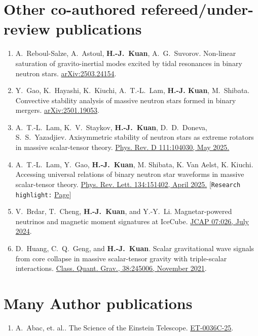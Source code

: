 \documentclass[10pt,floatfix,a4paper]{article}
\begin{document}
\section*{Other co-authored refereed/under-review publications}
\begin{enumerate}
	\item A.~Reboul-Salze, A.~Astoul, \textbf{H.-J.~Kuan}, A.~G.~Suvorov. Non-linear saturation of gravito-inertial modes excited by tidal resonances in binary neutron stars. \href{https://arxiv.org/abs/2503.24154}{arXiv:2503.24154}.
	\item Y.~Gao, K.~Hayashi, K.~Kiuchi, A.~T.-L.~Lam, \textbf{H.-J. Kuan}, M.~Shibata. Convective stability analysis of massive neutron stars formed in binary mergers. \href{https://arxiv.org/abs/2501.19053}{arXiv:2501.19053}.
	\item A.~T.-L.~Lam, K.~V.~Staykov, \textbf{H.-J.~Kuan}, D.~D.~Doneva, S.~S.~Yazadjiev. Axisymmetric stability of neutron stars as extreme rotators in massive scalar-tensor theory. \href{https://journals.aps.org/prd/abstract/10.1103/PhysRevD.111.104030}{Phys. Rev. D 111:104030, May 2025.}
	\item A.~T.-L.~Lam, Y.~Gao, \textbf{H.-J.~Kuan}, M. Shibata, K. Van Aelst, K. Kiuchi. Accessing universal relations of binary neutron star waveforms in massive scalar-tensor theory. \href{https://journals.aps.org/prl/abstract/10.1103/PhysRevLett.134.151402}{Phys. Rev. Lett. 134:151402, April 2025.} [\texttt{Research highlight:} \href{https://www.aei.mpg.de/1246017/modelling-120-binary-neutron-star-mergers?c=26149}{Page}]
	\item V.~Brdar, T.~Cheng, \textbf{H.-J.~Kuan}, and Y.-Y.~Li. Magnetar-powered neutrinos and magnetic moment signatures at IceCube. \href{https://iopscience.iop.org/article/10.1088/1475-7516/2024/07/026}{JCAP 07:026, July 2024}. 
	\item D.~Huang, C.~Q.~Geng, and \textbf{H.-J.~Kuan}. Scalar gravitational wave signals from core collapse in massive scalar-tensor gravity with triple-scalar interactions. \href{https://doi.org/10.1088/1361-6382/ac35ab}{Class. Quant. Grav., 38:245006, November 2021}.
\end{enumerate}

\section*{Many Author publications}
\begin{enumerate}
	\item A.~Abac, et. al.. The Science of the Einstein Telescope. \href{https://arxiv.org/abs/2503.12263}{ET-0036C-25}.
\end{enumerate}
\end{document}
